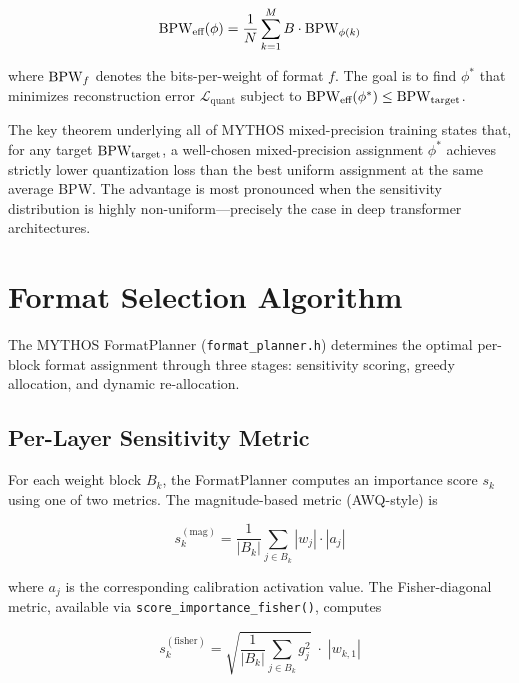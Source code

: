 \begin{equation}
\textnormal{BPW}_{\text{eff}}(\phi)
  = \frac{1}{N} \sum_{k=1}^{M} B \cdot \textnormal{BPW}_{\phi(k)}
\label{eq:bpw_eff}
\end{equation}

\noindent where $\textnormal{BPW}_f$ denotes the bits-per-weight of format $f$.
The goal is to find $\phi^*$ that minimizes reconstruction error
$\mathcal{L}_{\text{quant}}$ subject to
$\textnormal{BPW}_{\text{eff}}(\phi^*) \leq \textnormal{BPW}_{\text{target}}$.

The key theorem underlying all of MYTHOS mixed-precision training
states that, for any target $\textnormal{BPW}_{\text{target}}$, a well-chosen
mixed-precision assignment $\phi^*$ achieves strictly lower
quantization loss than the best uniform assignment at the same average
BPW.  The advantage is most pronounced when the sensitivity distribution
is highly non-uniform---precisely the case in deep transformer
architectures.

\section{Format Selection Algorithm}
\label{sec:format_selection}

The MYTHOS FormatPlanner (\texttt{format\_planner.h}) determines the
optimal per-block format assignment through three stages: sensitivity
scoring, greedy allocation, and dynamic re-allocation.

\subsection{Per-Layer Sensitivity Metric}

For each weight block $B_k$, the FormatPlanner computes an importance
score $s_k$ using one of two metrics.  The magnitude-based metric
(AWQ-style) is

\begin{equation}
s_k^{(\text{mag})}
  = \frac{1}{|B_k|} \sum_{j \in B_k} |w_j| \cdot |a_j|
\label{eq:sensitivity_mag}
\end{equation}

\noindent where $a_j$ is the corresponding calibration activation
value.  The Fisher-diagonal metric, available via
\texttt{score\_importance\_fisher()}, computes

\begin{equation}
s_k^{(\text{fisher})}
  = \sqrt{\frac{1}{|B_k|} \sum_{j \in B_k} g_j^2}
    \;\cdot\; |w_{k,1}|
\label{eq:sensitivity_fisher}
\end{equation}

